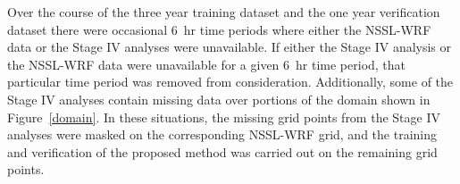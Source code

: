 Over the course of the three year training dataset and the one year verification dataset there were occasional \mbox{6 hr} time periods where either the NSSL-WRF data or the Stage IV analyses were unavailable.
If either the Stage IV analysis or the NSSL-WRF data were unavailable for a given \mbox{6 hr} time period, that particular time period was removed from consideration.
Additionally, some of the Stage IV analyses contain missing data over portions of the domain shown in \mbox{Figure \ref{domain}}.
In these situations, the missing grid points from the Stage IV analyses were masked on the corresponding NSSL-WRF grid, and the training and verification of the proposed method was carried out on the remaining grid points.
